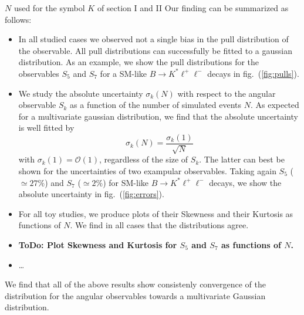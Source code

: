 \documentclass[aps,prd,reprint,nofootinbib,preprintnumbers]{revtex4}
\newcommand{\order}[1]{\mathcal{O}\left({#1}\right)}
\newcommand{\reffig}[1]{fig.~(\ref{fig:#1})}
\newcommand{\todo}[1]{{\color{red}\bf ToDo: #1}}
\newcommand{\fred}[1]{{\color{brown!85!black}#1}}
\begin{document}
\fred{$N$ used for the symbol $K$ of section I and II}
Our finding can be summarized as follows:
\begin{itemize}
    \item In all studied cases we observed not a single bias in the pull distribution of the observable.
        All pull distributions can successfully be fitted to a gaussian distribution. As an example, we
        show the pull distributions for the observables $S_5$ and $S_7$ for a SM-like $B\to K^*\ell^+\ell^-$
        decays in \reffig{pulls}.
    \item We study the absolute uncertainty $\sigma_k(N)$ with respect to the angular observable $S_k$
        as a function of the number of simulated events $N$. As expected for a multivariate gaussian
        distribution, we find that the absolute uncertainty is well fitted by
        \begin{equation}
            \sigma_k(N) = \frac{\sigma_k(1)}{\sqrt{N}}
        \end{equation}
        with $\sigma_k(1) = \order{1}$, regardless of the size of $S_k$. The latter can best be shown
        for the uncertainties of two exampular observables. Taking again $S_5$ ($\simeq 27\%$) and $S_7$ ($\simeq 2\%$)
        for SM-like $B\to K^*\ell^+\ell^-$ decays, we show the absolute uncertainty in \reffig{errors}.
    \item For all toy studies, we produce plots of their Skewness and their Kurtosis as functions of
        $N$. We find in all cases that the distributions agree.
    \item \todo{Plot Skewness and Kurtosis for $S_5$ and $S_7$ as functions of $N$.}
    \item \dots
\end{itemize}
We find that all of the above results show consistenly convergence of the distribution for the angular observables
towards a multivariate Gaussian distribution.
\end{document}
